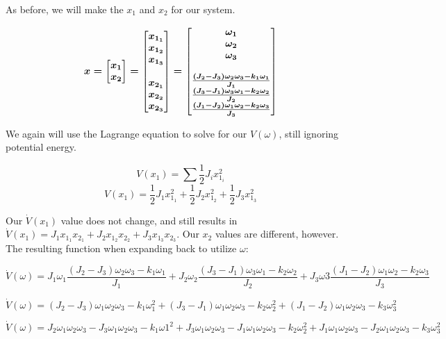 \documentclass{article}
\begin{document}
As before, we will make the $x_1$ and $x_2$ for our system.

\[ \boldmath{x} = \begin{bmatrix}
    x_1 \\ x_2
\end{bmatrix} = \begin{bmatrix}
    x_{1_1} \\
    x_{1_2} \\ 
    x_{1_3} \\
    \\
    x_{2_1} \\
    x_{2_2} \\
    x_{2_3} 
\end{bmatrix} =
\begin{bmatrix}
    \omega_1 \\
    \omega_2 \\
    \omega_3 \\
    \\ 
    \frac{(J_2 - J_3)\omega_2 \omega_3 - k_1 \omega_1}{J_1} \\
    \frac{(J_3 - J_1)\omega_3 \omega_1 - k_2 \omega_2}{J_2} \\
    \frac{(J_1 - J_2)\omega_1 \omega_2 - k_2 \omega_3}{J_3}
\end{bmatrix}\]

We again will use the Lagrange equation to solve for our $V(\omega)$, still ignoring potential energy.

\[ V(x_1) = \sum \frac{1}{2} J_i x_{1_i}^2 \]
\[ V(x_1) = \frac{1}{2} J_1 x_{1_1}^2 + \frac{1}{2} J_2 x_{1_2}^2 + \frac{1}{2} J_3 x_{1_3}^2 \]

Our $\dot{V}(x_1)$ value does not change, and still results in $ \dot{V}(x_1) = J_1 x_{1_1} x_{2_1} + J_2 x_{1_2} x_{2_2} + J_3 x_{1_3} x_{2_3}$. Our $x_2$ values are different, however. The resulting function when expanding back to utilize $\omega$:

\[
    \dot{V}(\omega) = J_1  \omega_1 \frac{(J_2 - J_3)\omega_2 \omega_3 - k_1 \omega_1}{J_1} + J_2 \omega_2 \frac{(J_3 - J_1)\omega_3 \omega_1 - k_2 \omega_2}{J_2} + J_3 \omega3 \frac{(J_1 - J_2)\omega_1 \omega_2 - k_2 \omega_3}{J_3}
\]

\[
    \dot{V}(\omega) = (J_2-J_3)\omega_1 \omega_2 \omega_3 - k_1 \omega_1^2 + (J_3-J_1)\omega_1 \omega_2 \omega_3 - k_2 \omega_2^2 + (J_1-J_2)\omega_1 \omega_2 \omega_3 - k_3 \omega_3^2
\]

\[
    \dot{V}(\omega) = J_2 \omega_1 \omega_2 \omega_3 - J_3 \omega_1 \omega_2 \omega_3 - k_1 \omega1^2 + J_3 \omega_1 \omega_2 \omega_3 - J_1 \omega_1 \omega_2 \omega_3 - k_2 \omega_2^2 + J_1 \omega_1 \omega_2 \omega_3 - J_2 \omega_1 \omega_2 \omega_3 - k_3 \omega_3^2
\]
\end{document}
